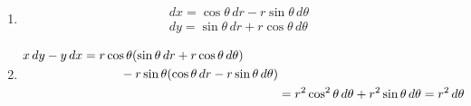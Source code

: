 \begin{ans*}
  ${}$
  \begin{enumerate}[label=(\arabic*)]
    \item
    \begin{gather}
      dx = \cos\theta\,dr - r\sin\theta\,d\theta \\
      dy = \sin\theta\,dr + r\cos\theta\,d\theta
    \end{gather}
    \item
    \begin{align}
      \begin{split}
        x\,dy - y\,dx
        &= r\cos\theta(\sin\theta \,dr + r\cos\theta\,d\theta) \\
        &\hspace*{30pt} - r\sin\theta(\cos\theta\,dr - r\sin\theta\,d\theta)
      \end{split}\\
      &= r^2\cos^2\theta\,d\theta + r^2\sin\theta\,d\theta = r^2\,d\theta
    \end{align}
  \end{enumerate}
\end{ans*}


